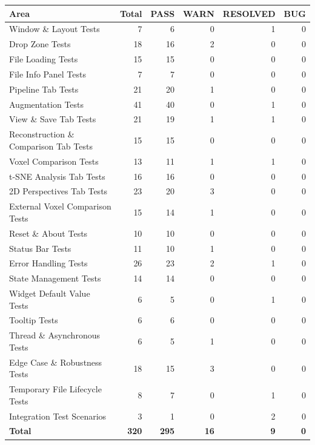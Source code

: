 \documentclass[12pt,a4paper]{article}
\begin{document}
\begin{center}
\small
\begin{longtable}{lrrrrr}
\toprule
\textbf{Area} & \textbf{Total} & \textbf{PASS} & \textbf{WARN} & \textbf{RESOLVED} & \textbf{BUG} \\
\midrule
Window \& Layout Tests & 7 & 6 & 0 & 1 & 0 \\
Drop Zone Tests & 18 & 16 & 2 & 0 & 0 \\
File Loading Tests & 15 & 15 & 0 & 0 & 0 \\
File Info Panel Tests & 7 & 7 & 0 & 0 & 0 \\
Pipeline Tab Tests & 21 & 20 & 1 & 0 & 0 \\
Augmentation Tests & 41 & 40 & 0 & 1 & 0 \\
View \& Save Tab Tests & 21 & 19 & 1 & 1 & 0 \\
Reconstruction \& Comparison Tab Tests & 15 & 15 & 0 & 0 & 0 \\
Voxel Comparison Tests & 13 & 11 & 1 & 1 & 0 \\
t-SNE Analysis Tab Tests & 16 & 16 & 0 & 0 & 0 \\
2D Perspectives Tab Tests & 23 & 20 & 3 & 0 & 0 \\
External Voxel Comparison Tests & 15 & 14 & 1 & 0 & 0 \\
Reset \& About Tests & 10 & 10 & 0 & 0 & 0 \\
Status Bar Tests & 11 & 10 & 1 & 0 & 0 \\
Error Handling Tests & 26 & 23 & 2 & 1 & 0 \\
State Management Tests & 14 & 14 & 0 & 0 & 0 \\
Widget Default Value Tests & 6 & 5 & 0 & 1 & 0 \\
Tooltip Tests & 6 & 6 & 0 & 0 & 0 \\
Thread \& Asynchronous Tests & 6 & 5 & 1 & 0 & 0 \\
Edge Case \& Robustness Tests & 18 & 15 & 3 & 0 & 0 \\
Temporary File Lifecycle Tests & 8 & 7 & 0 & 1 & 0 \\
Integration Test Scenarios & 3 & 1 & 0 & 2 & 0 \\
\midrule
\textbf{Total} & \textbf{320} & \textbf{295} & \textbf{16} & \textbf{9} & \textbf{0} \\
\bottomrule
\end{longtable}
\end{center}
\end{document}
